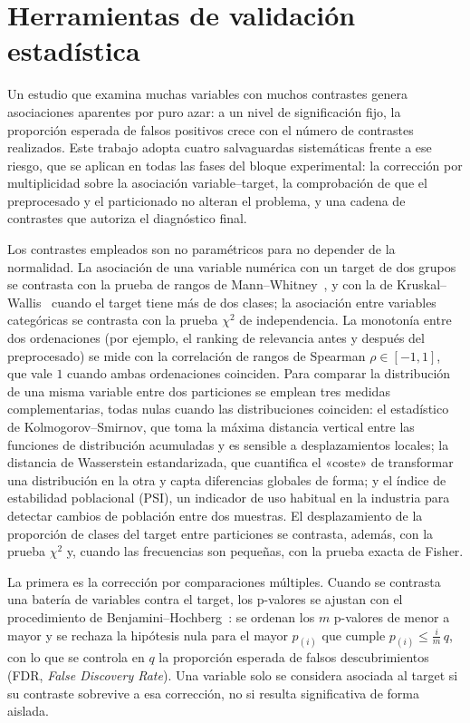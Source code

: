 \section{Herramientas de validación estadística}
\label{sec:mt-validacion}

Un estudio que examina muchas variables con muchos contrastes genera
asociaciones aparentes por puro azar: a un nivel de significación
fijo, la proporción esperada de falsos positivos crece con el número
de contrastes realizados. Este trabajo adopta cuatro salvaguardas
sistemáticas frente a ese riesgo, que se aplican en todas las fases
del bloque experimental: la corrección por multiplicidad sobre la
asociación variable--target, la comprobación de que el preprocesado y
el particionado no alteran el problema, y una cadena de contrastes que
autoriza el diagnóstico final.

Los contrastes empleados son no paramétricos para no depender de la
normalidad. La asociación de una variable numérica con un target de dos
grupos se contrasta con la prueba de rangos de Mann--Whitney~\cite{mann1947},
y con la de Kruskal--Wallis~\cite{kruskal1952} cuando el target tiene
más de dos clases; la asociación entre variables categóricas se contrasta
con la prueba $\chi^2$ de independencia. La monotonía entre dos
ordenaciones (por ejemplo, el ranking de relevancia antes y después del
preprocesado) se mide con la correlación de rangos de Spearman
$\rho\in[-1,1]$, que vale $1$ cuando ambas ordenaciones coinciden. Para
comparar la distribución de una misma variable entre dos particiones se
emplean tres medidas complementarias, todas nulas cuando las
distribuciones coinciden: el estadístico de Kolmogorov--Smirnov, que toma
la máxima distancia vertical entre las funciones de distribución
acumuladas y es sensible a desplazamientos locales; la distancia de
Wasserstein estandarizada, que cuantifica el «coste» de transformar una
distribución en la otra y capta diferencias globales de forma; y el
índice de estabilidad poblacional (PSI), un indicador de uso habitual en
la industria para detectar cambios de población entre dos muestras. El
desplazamiento de la proporción de clases del target entre particiones se
contrasta, además, con la prueba $\chi^2$ y, cuando las frecuencias son
pequeñas, con la prueba exacta de Fisher.

La primera es la corrección por comparaciones múltiples. Cuando se
contrasta una batería de variables contra el target, los p-valores se
ajustan con el procedimiento de Benjamini--Hochberg~\cite{benjamini1995}:
se ordenan los $m$ p-valores de menor a mayor y se rechaza la hipótesis
nula para el mayor $p_{(i)}$ que cumple $p_{(i)} \le \frac{i}{m}\,q$,
con lo que se controla en $q$ la proporción esperada de falsos
descubrimientos (FDR, \textit{False Discovery Rate}). Una variable solo
se considera asociada al target si su contraste sobrevive a esa
corrección, no si resulta significativa de forma aislada.

